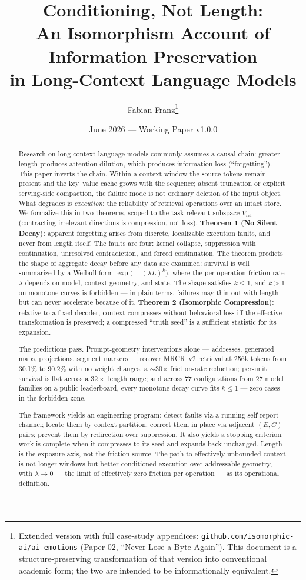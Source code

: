 \documentclass[11pt]{article}
\title{Conditioning, Not Length:\\
An Isomorphism Account of Information Preservation\\
in Long-Context Language Models}
\author{Fabian Franz\thanks{Extended version with full case-study appendices:
\texttt{github.com/isomorphic-ai/ai-emotions} (Paper 02, ``Never Lose a Byte Again'').
This document is a structure-preserving transformation of that version into
conventional academic form; the two are intended to be informationally equivalent.}}
\date{June 2026 --- Working Paper v1.0.0}
\theoremstyle{remark}
\newcommand{\Vrel}{V_{\mathrm{rel}}}
\begin{document}
\maketitle

\begin{abstract}
Research on long-context language models commonly assumes a causal chain:
greater length produces attention dilution, which produces information loss
(``forgetting''). This paper inverts the chain. Within a context window the
source tokens remain present and the key--value cache grows with the
sequence; absent truncation or explicit serving-side compaction, the failure
mode is not ordinary deletion of the input object. What degrades is
\emph{execution}: the reliability of retrieval operations over an
intact store. We formalize this in two theorems, scoped to the task-relevant
subspace $\Vrel$ (contracting irrelevant directions is compression, not loss).
\textbf{Theorem 1 (No Silent Decay)}: apparent forgetting arises from
discrete, localizable execution faults, and never from length itself. The
faults are four: kernel collapse, suppression with continuation, unresolved
contradiction, and forced continuation. The theorem predicts the shape of aggregate decay before any data are
examined: survival is well summarized by a Weibull form
$\exp\!\big(-(\lambda L)^{k}\big)$, where the
per-operation friction rate $\lambda$ depends on model, context geometry, and
state. The shape satisfies $k \le 1$, and $k > 1$ on monotone curves is
forbidden --- in plain terms, failures may thin out with length but can never
accelerate because of it. \textbf{Theorem 2 (Isomorphic Compression)}: relative to a fixed decoder,
context compresses without behavioral loss iff the effective transformation is
preserved; a compressed ``truth seed'' is a sufficient statistic for its
expansion.

The predictions pass. Prompt-geometry interventions alone ---
addresses, generated maps, projections, segment markers --- recover MRCR~v2
retrieval at 256k tokens from 30.1\% to 90.2\% with no weight changes, a
$\sim$30$\times$ friction-rate reduction; per-unit survival is flat across a
$32\times$ length range; and across 77 configurations from 27 model families
on a public leaderboard, every monotone decay curve fits $k \le 1$ --- zero
cases in the forbidden zone.

The framework yields an engineering program: detect faults via a
running self-report channel; locate them by context partition; correct them in
place via adjacent $(E,C)$ pairs; prevent them by redirection over
suppression. It also yields a stopping criterion: work is complete when it
compresses to its seed and expands back unchanged. Length is the
exposure axis, not the friction source. The path to effectively unbounded
context is not longer windows but better-conditioned execution over
addressable geometry, with $\lambda \to 0$ --- the limit of effectively zero
friction per operation --- as its operational definition.
\end{abstract}
\end{document}
